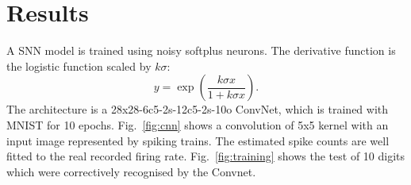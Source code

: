 \documentclass[runningheads,a4paper]{llncs}
\begin{document}
\section{Results}
A SNN model is trained using noisy softplus neurons.
The derivative function is the logistic function scaled by $k\sigma$:
\begin{equation}
y = \exp(\frac{k\sigma x}{1 + k\sigma x}).
\label{equ:logist}
\end{equation}
The architecture is a 28x28-6c5-2s-12c5-2s-10o ConvNet, which is trained with MNIST for 10 epochs.
Fig.~\ref{fig:cnn} shows a convolution of 5x5 kernel with an input image represented by spiking trains.
The estimated spike counts are well fitted to the real recorded firing rate.
Fig.~\ref{fig:training} shows the test of 10 digits which were correctively recognised by the Convnet. 
\begin{figure}[bt!]
	\centering
	\\

\end{figure}
\end{document}
